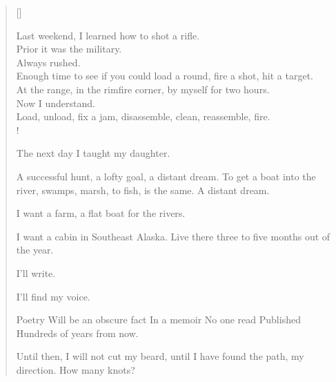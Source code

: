 \documentclass[11pt, a4paper]{article}
\newcommand{\poemauthorright}[1]{\nopagebreak{\raggedleft\footnotesize\textsc{#1}\par}} %
\begin{document}
\begin{verse}[\versewidth]

Last weekend, I learned how to shot a rifle. \\
Prior it was the military. \\ 
Always rushed. \\
Enough time to see if you could load a round, fire a shot, hit a target. \\ 
At the range, in the rimfire corner, by myself for two hours. \\
Now I understand. \\
Load, unload, fix a jam, disassemble, clean, reassemble, fire. \\!

The next day I taught my daughter. 

A successful hunt, a lofty goal, a distant dream. To get a boat into the river, swamps, marsh, to fish, is the same. A distant dream.  

I want a farm, a flat boat for the rivers.

I want a cabin in Southeast Alaska. Live there three to five months out of the year. 

I'll write.

I'll find my voice.


Poetry
Will be an obscure fact
In a memoir
No one read
Published
Hundreds of years from now.


Until then, I will not cut my beard, until I have found the path, my direction. 
How many knots?


\end{verse}


\poemauthorright{J. Theriot} %
\end{document}
